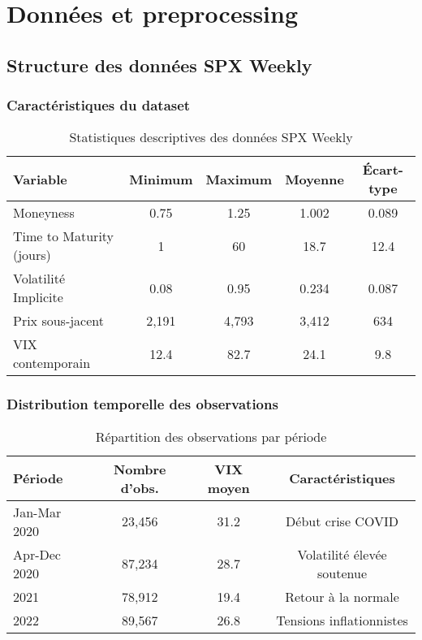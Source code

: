 \section{Données et preprocessing}

\subsection{Structure des données SPX Weekly}

\subsubsection{Caractéristiques du dataset}

\begin{table}[H]
\centering
\caption{Statistiques descriptives des données SPX Weekly}
\begin{tabular}{@{}lcccc@{}}
\toprule
\textbf{Variable} & \textbf{Minimum} & \textbf{Maximum} & \textbf{Moyenne} & \textbf{Écart-type} \\
\midrule
Moneyness & 0.75 & 1.25 & 1.002 & 0.089 \\
Time to Maturity (jours) & 1 & 60 & 18.7 & 12.4 \\
Volatilité Implicite & 0.08 & 0.95 & 0.234 & 0.087 \\
Prix sous-jacent & 2,191 & 4,793 & 3,412 & 634 \\
VIX contemporain & 12.4 & 82.7 & 24.1 & 9.8 \\
\bottomrule
\end{tabular}
\end{table}

\subsubsection{Distribution temporelle des observations}

\begin{table}[H]
\centering
\caption{Répartition des observations par période}
\begin{tabular}{@{}lccc@{}}
\toprule
\textbf{Période} & \textbf{Nombre d'obs.} & \textbf{VIX moyen} & \textbf{Caractéristiques} \\
\midrule
Jan-Mar 2020 & 23,456 & 31.2 & Début crise COVID \\
Apr-Dec 2020 & 87,234 & 28.7 & Volatilité élevée soutenue \\
2021 & 78,912 & 19.4 & Retour à la normale \\
2022 & 89,567 & 26.8 & Tensions inflationnistes \\
\bottomrule
\end{tabular}
\end{table}

